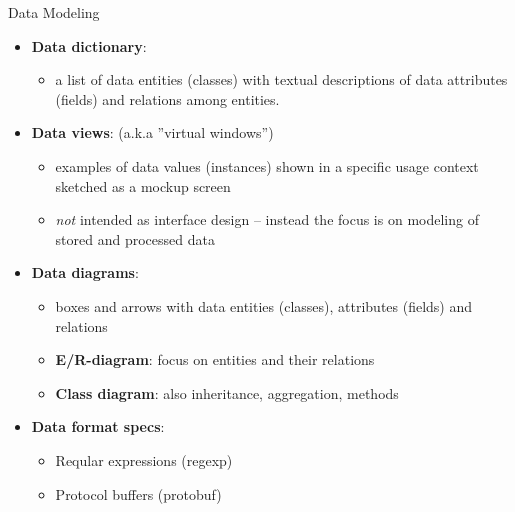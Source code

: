 \begin{Slide}{Data Modeling }
\begin{itemize}
\item \textbf{Data dictionary}:  
\begin{itemize}
\item a list of data entities (classes) with textual descriptions of data attributes (fields) and relations among entities.
\end{itemize}
\item \textbf{Data views}: (a.k.a ''virtual windows'')
\begin{itemize}
\item examples of data values (instances) shown in a specific usage context sketched as a mockup screen
\item \textit{not} intended as interface design -- instead the focus is on modeling of stored and processed data 
\end{itemize}
\item \textbf{Data diagrams}: 
\begin{itemize}
\item boxes and arrows with data entities (classes), attributes (fields) and relations
\item \textbf{E/R-diagram}: focus on entities and their relations 
\item \textbf{Class diagram}: also inheritance, aggregation, methods
\end{itemize}
\item \textbf{Data format specs}:
\begin{itemize}
\item Reqular expressions (regexp)
\item Protocol buffers (protobuf)

\end{itemize}
\end{itemize}
\end{Slide}
